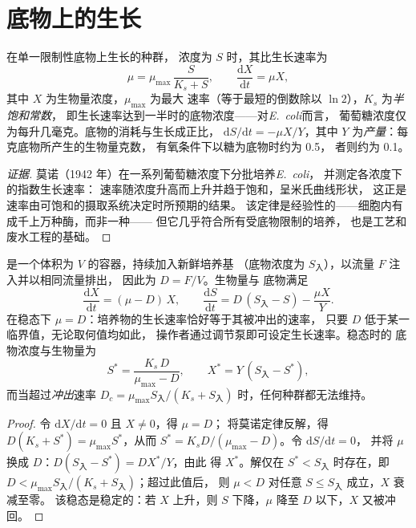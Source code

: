 \section{底物上的生长}

\begin{theorem}[莫诺定律]\label{thm:b2:microbial-metabolism:monod}
在单一限制性底物上生长的种群，
浓度为 $S$ 时，其比生长速率为
\[
\mu = \mu_{\max}\,\frac{S}{K_s + S}, \qquad \frac{\mathrm{d}X}{\mathrm{d}t} = \mu X,
\]
其中 $X$ 为生物量浓度，$\mu_{\max}$ 为最大
速率（等于最短的倒数除以
$\ln 2$），$K_s$ 为\emph{半饱和常数}，
即生长速率达到一半时的底物浓度——对\emph{E.~coli}而言，
葡萄糖浓度仅为每升几毫克。底物的消耗与生长成正比，
$\mathrm{d}S/\mathrm{d}t =
-\mu X/Y$，其中 $Y$ 为\emph{产量}：每克底物所产生的生物量克数，
有氧条件下以糖为底物时约为 \num{0.5}，
者则约为 \num{0.1}。
\end{theorem}
\begin{proof}[证据]
莫诺（1942 年）在一系列葡萄糖浓度下分批培养\emph{E.~coli}，
并测定各浓度下的指数生长速率：
速率随浓度升高而上升并趋于饱和，呈米氏曲线形状，
这正是速率由可饱和的摄取系统决定时所预期的结果。
该定律是经验性的——细胞内有成千上万种酶，而非一种——
但它几乎符合所有受底物限制的培养，
也是工艺和
废水工程的基础。
\end{proof}

\begin{theorem}[恒化器]\label{thm:b2:microbial-metabolism:chemostat}
\emph{}是一个体积为 $V$ 的容器，持续加入新鲜培养基
（底物浓度为 $S_{\text{入}}$），以流量 $F$ 注入并以相同流量排出，
因此\emph{}为 $D = F/V$。生物量与
底物满足
\[
\frac{\mathrm{d}X}{\mathrm{d}t} = (\mu - D)\,X, \qquad
\frac{\mathrm{d}S}{\mathrm{d}t} = D\,(S_{\text{入}} - S) - \frac{\mu X}{Y}.
\]
在稳态下 $\mu = D$：培养物的生长速率恰好等于其被冲出的速率，
只要 $D$ 低于某一临界值，无论取何值均如此，
操作者通过调节泵即可设定生长速率。稳态时的
底物浓度与生物量为
\[
S^* = \frac{K_s\,D}{\mu_{\max} - D}, \qquad X^* = Y\,(S_{\text{入}} - S^*),
\]
而当超过\emph{冲出}速率 $D_c = \mu_{\max}
S_{\text{入}}/(K_s + S_{\text{入}})$ 时，任何种群都无法维持。
\end{theorem}
\begin{proof}
令 $\mathrm{d}X/\mathrm{d}t = 0$ 且 $X \neq 0$，得 $\mu = D$；
将莫诺定律反解，得 $D(K_s + S^*) = \mu_{\max} S^*$，从而 $S^* =
K_s D/(\mu_{\max} - D)$。令 $\mathrm{d}S/\mathrm{d}t = 0$，
并将 $\mu$ 换成 $D$：$D(S_{\text{入}} - S^*) = DX^*/Y$，由此
得 $X^*$。解仅在 $S^* < S_{\text{入}}$ 时存在，即\
$D < \mu_{\max} S_{\text{入}}/(K_s + S_{\text{入}})$；超过此值后，
则 $\mu < D$ 对任意 $S \le S_{\text{入}}$ 成立，$X$ 衰减至零。
该稳态是稳定的：若 $X$ 上升，则 $S$ 下降，$\mu$ 降至
$D$ 以下，$X$ 又被冲回。
\end{proof}

